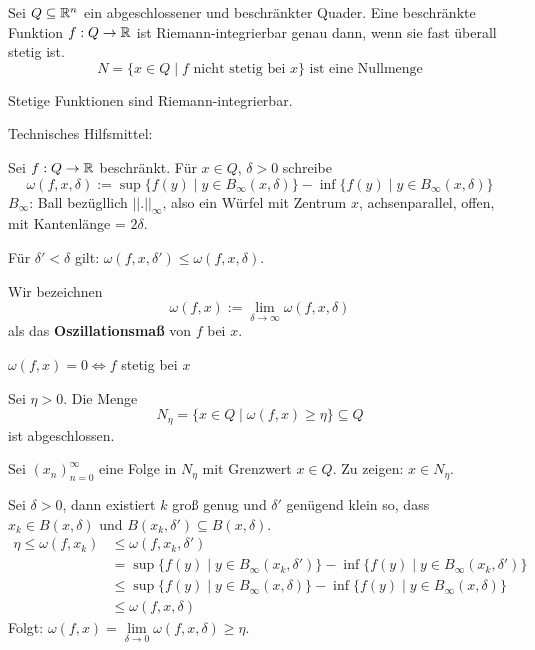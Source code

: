 \documentclass[main.tex]{subfiles}
\begin{document}
\begin{Theorem}
  Sei $Q \subseteq \mathbb{R}^n$ ein abgeschlossener und beschränkter Quader. Eine beschränkte Funktion $f: Q \to \mathbb{R}$ ist Riemann-integrierbar genau dann, wenn sie fast überall stetig ist.
  $$N = \{x \in Q \mid f \text{ nicht stetig bei } x\} \text{ ist eine Nullmenge}$$
\end{Theorem}

\begin{Korollar}
  Stetige Funktionen sind Riemann-integrierbar.
\end{Korollar}

\begin{Beweis}
  Technisches Hilfsmittel:
  \begin{Definition}[Oszillationsmaß]
    Sei $f: Q \to \mathbb{R}$ beschränkt. Für $x \in Q$, $\delta > 0$ schreibe
    $$\omega(f, x, \delta) := \sup\{f(y) \mid y \in B_\infty(x,\delta)\} - \inf\{f(y) \mid y \in B_\infty(x,\delta)\}$$
    $B_\infty$: Ball bezügllich $||.||_\infty$, also ein Würfel mit Zentrum $x$, achsenparallel, offen, mit Kantenlänge = $2 \delta$.

    Für $\delta' < \delta$ gilt: $\omega(f, x, \delta') \leq \omega(f, x, \delta)$.

    Wir bezeichnen
    $$\omega(f,x) := \lim \limits_{\delta \to \infty} \omega(f,x,\delta)$$
    als das \textbf{Oszillationsmaß} von $f$ bei $x$.
  \end{Definition}
  \begin{Bemerkung}
    $\omega(f,x) = 0 \Leftrightarrow f$ stetig bei $x$
  \end{Bemerkung}
  \begin{Lemma}
    Sei $\eta > 0$. Die Menge
    $$N_\eta = \{x \in Q \mid \omega(f,x) \geq \eta \} \subseteq Q$$
    ist abgeschlossen.
  \end{Lemma}
  \begin{Beweis}[Folgenkriterium]
    Sei $(x_n)_{n=0}^\infty$ eine Folge in $N_\eta$ mit Grenzwert $x \in Q$. Zu zeigen: $x \in N_\eta$.

    Sei $\delta > 0$, dann existiert $k$ groß genug und $\delta'$ genügend klein so, dass $x_k \in B(x,\delta)$ und $B(x_k,\delta') \subseteq B(x, \delta)$.
    $$\begin{aligned}
      \eta \leq \omega(f,x_k) & \leq \omega(f, x_k, \delta') \\
      & = \sup\{f(y) \mid y \in B_\infty(x_k,\delta')\} - \inf\{f(y) \mid y \in B_\infty(x_k,\delta')\} \\
      & \leq \sup\{f(y) \mid y \in B_\infty(x,\delta)\} - \inf\{f(y) \mid y \in B_\infty(x,\delta)\} \\
      & \leq \omega(f,x,\delta)
    \end{aligned}$$
    Folgt: $\omega(f,x) = \lim \limits_{\delta \to 0} \omega(f,x,\delta) \geq \eta$.


\end{Beweis}
\end{Beweis}
\end{document}
